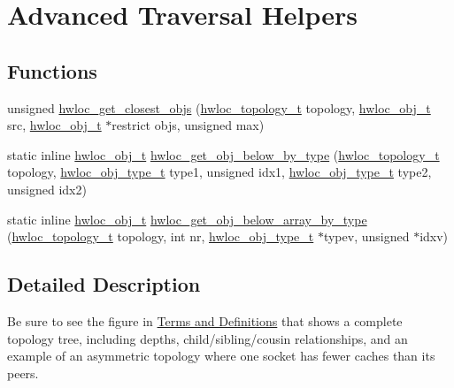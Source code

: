 \hypertarget{a00058}{
\section{Advanced Traversal Helpers}
\label{a00058}
}
\subsection*{Functions}
\begin{DoxyCompactItemize}
\item 
 unsigned \hyperlink{a00058_ga26c2ac4f25b1ed293249c88e232f1bea}{hwloc\_\-get\_\-closest\_\-objs} (\hyperlink{a00039_ga9d1e76ee15a7dee158b786c30b6a6e38}{hwloc\_\-topology\_\-t} topology, \hyperlink{a00016}{hwloc\_\-obj\_\-t} src, \hyperlink{a00016}{hwloc\_\-obj\_\-t} $\ast$restrict objs, unsigned max)
\item 
static inline \hyperlink{a00016}{hwloc\_\-obj\_\-t} \hyperlink{a00058_ga6c482c2097f01b1ff88598fec8a1ba3b}{hwloc\_\-get\_\-obj\_\-below\_\-by\_\-type} (\hyperlink{a00039_ga9d1e76ee15a7dee158b786c30b6a6e38}{hwloc\_\-topology\_\-t} topology, \hyperlink{a00041_gacd37bb612667dc437d66bfb175a8dc55}{hwloc\_\-obj\_\-type\_\-t} type1, unsigned idx1, \hyperlink{a00041_gacd37bb612667dc437d66bfb175a8dc55}{hwloc\_\-obj\_\-type\_\-t} type2, unsigned idx2) 
\item 
static inline \hyperlink{a00016}{hwloc\_\-obj\_\-t} \hyperlink{a00058_gac33a0990f4e771b2117ddedabc3f00f6}{hwloc\_\-get\_\-obj\_\-below\_\-array\_\-by\_\-type} (\hyperlink{a00039_ga9d1e76ee15a7dee158b786c30b6a6e38}{hwloc\_\-topology\_\-t} topology, int nr, \hyperlink{a00041_gacd37bb612667dc437d66bfb175a8dc55}{hwloc\_\-obj\_\-type\_\-t} $\ast$typev, unsigned $\ast$idxv) 
\end{DoxyCompactItemize}


\subsection{Detailed Description}
Be sure to see the figure in \hyperlink{a00001}{Terms and Definitions} that shows a complete topology tree, including depths, child/sibling/cousin relationships, and an example of an asymmetric topology where one socket has fewer caches than its peers. 

